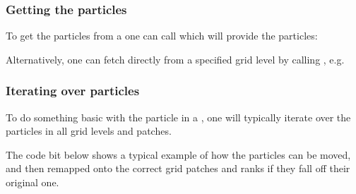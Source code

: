 \documentclass[letterpaper,10pt,english]{sphinxmanual}
\begin{document}
\subsubsection{Getting the particles}
\label{\detokenize{Source/Particles:getting-the-particles}}
To get the particles from a  one can call  which will provide the particles:

\begin{sphinxVerbatim}[commandchars=\\\{\},formatcom=\scriptsize]
 

   
\end{sphinxVerbatim}

Alternatively, one can fetch directly from a specified grid level by calling , e.g.

\begin{sphinxVerbatim}[commandchars=\\\{\},formatcom=\scriptsize]
 
 

   \PYG{p}{[}\PYG{p}{]}
\end{sphinxVerbatim}


\subsubsection{Iterating over particles}
\label{\detokenize{Source/Particles:iterating-over-particles}}
To do something basic with the particle in a , one will typically iterate over the particles in all grid levels and patches.

The code bit below shows a typical example of how the particles can be moved, and then remapped onto the correct grid patches and ranks if they fall off their original one.
\end{document}
